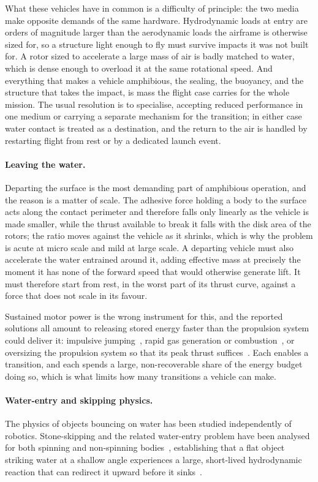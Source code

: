 What these vehicles have in common is a difficulty of principle: the two media
make opposite demands of the same hardware.  Hydrodynamic loads at entry are
orders of magnitude larger than the aerodynamic loads the airframe is otherwise
sized for, so a structure light enough to fly must survive impacts it was not
built for.  A rotor sized to accelerate a large mass of air is badly matched to
water, which is dense enough to overload it at the same rotational speed.  And
everything that makes a vehicle amphibious, the sealing, the buoyancy, and the
structure that takes the impact, is mass the flight case carries for the whole
mission.  The usual resolution is to specialise, accepting reduced performance
in one medium or carrying a separate mechanism for the transition; in either
case water contact is treated as a destination, and the return to the air is
handled by restarting flight from rest or by a dedicated launch event.

\paragraph{Leaving the water.}
Departing the surface is the most demanding part of amphibious operation, and
the reason is a matter of scale.  The adhesive force holding a body to the
surface acts along the contact perimeter and therefore falls only linearly as
the vehicle is made smaller, while the thrust available to break it falls with
the disk area of the rotors; the ratio moves against the vehicle as it shrinks,
which is why the problem is acute at micro scale and mild at large scale.  A
departing vehicle must also accelerate the water entrained around it, adding
effective mass at precisely the moment it has none of the forward speed that
would otherwise generate lift.  It must therefore start from rest, in the worst
part of its thrust curve, against a force that does not scale in its favour.

Sustained motor power is the wrong instrument for this, and the reported
solutions all amount to releasing stored energy faster than the propulsion
system could deliver it: impulsive jumping~\cite{zufferey2019consecutive},
rapid gas generation or combustion~\cite{chen2017biologically}, or oversizing
the propulsion system so that its peak thrust suffices~\cite{alzubi2018loon}.
Each enables a transition, and each spends a large, non-recoverable share of
the energy budget doing so, which is what limits how many transitions a vehicle
can make.

\paragraph{Water-entry and skipping physics.}
The physics of objects bouncing on water has been studied independently of
robotics.  Stone-skipping and the related water-entry problem have been
analysed for both spinning and non-spinning bodies~\cite{bocquet2003physics,truscott2014water}, establishing
that a flat object striking water at a shallow angle experiences a large,
short-lived hydrodynamic reaction that can redirect it upward before it
sinks~\cite{clanet2004secrets}.

